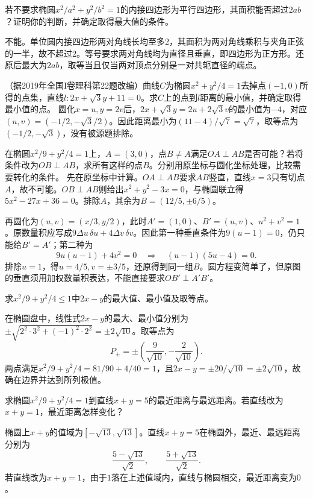 若不要求椭圆\(x^2/a^2+y^2/b^2=1\)的内接四边形为平行四边形，其面积能否超过\(2ab\)？证明你的判断，并确定取得最大值的条件。
\par
\solutionanswer
不能。单位圆内接四边形两对角线长均至多\(2\)，其面积为两对角线乘积与夹角正弦的一半，故不超过\(2\)。等号要求两对角线均为直径且垂直，即四边形为正方形。还原后最大为\(2ab\)，取等当且仅当两对顶点分别是一对共轭直径的端点。


（据2019年全国I卷理科第22题改编）曲线\(C\)为椭圆\(x^2+y^2/4=1\)去掉点\((-1,0)\)所得的点集，直线\(l:2x+\sqrt3y+11=0\)。求\(C\)上的点到\(l\)距离的最小值，并确定取得最小值的点。
\solutionanswer
圆化\(x=u,y=2v\)后，\(2x+\sqrt3y=2u+2\sqrt3v\)的最小值为\(-4\)，对应\((u,v)=(-1/2,-\sqrt3/2)\)。因此距离最小为\((11-4)/\sqrt7=\sqrt7\)，取等点为\((-1/2,-\sqrt3)\)，没有被源题排除。


在椭圆\(x^2/9+y^2/4=1\)上，\(A=(3,0)\)，点\(B\ne A\)满足\(OA\perp AB\)是否可能？若将条件改为\(OB\perp AB\)，求所有这样的点\(B\)。分别用原坐标与圆化坐标处理，比较需要转化的条件。
\solutionanswer
先在原坐标中计算。\(OA\perp AB\)要求\(AB\)竖直，直线\(x=3\)只有切点\(A\)，故不可能。\(OB\perp AB\)则给出\(x^2+y^2-3x=0\)，与椭圆联立得\(5x^2-27x+36=0\)。排除\(A\)，其余为\(B=(12/5,\pm6/5)\)。

再圆化为\((u,v)=(x/3,y/2)\)，此时\(A'=(1,0)\)、\(B'=(u,v)\)、\(u^2+v^2=1\)。原数量积应写成\(9\Delta u\,\delta u+4\Delta v\,\delta v\)。因此第一种垂直条件为\(9(u-1)=0\)，仍只能给\(B'=A'\)；第二种为
\[
 9u(u-1)+4v^2=0
 \quad\Longrightarrow\quad (u-1)(5u-4)=0.
\]
排除\(u=1\)，得\(u=4/5,v=\pm3/5\)，还原得到同一组\(B\)。圆方程变简单了，但原图的垂直须用加权数量积表达，不能直接要求\(OB'\perp A'B'\)。


求\(x^2/9+y^2/4\le1\)中\(2x-y\)的最大值、最小值及取等点。
\par
\solutionanswer
在椭圆盘中，线性式\(2x-y\)的最大、最小值分别为\(\pm\sqrt{2^2\cdot3^2+(-1)^2\cdot2^2}=\pm2\sqrt{10}\)。取等点为
\[
P_{\pm}=\pm\left(\frac{9}{\sqrt{10}},-\frac{2}{\sqrt{10}}\right).
\]
两点满足\(x^2/9+y^2/4=81/90+4/40=1\)，且\(2x-y=\pm20/\sqrt{10}=\pm2\sqrt{10}\)，故确在边界并达到所列极值。


求椭圆\(x^2/9+y^2/4=1\)到直线\(x+y=5\)的最近距离与最远距离。若直线改为\(x+y=1\)，最近距离怎样变化？
\par
\solutionanswer
椭圆上\(x+y\)的值域为\([-\sqrt{13},\sqrt{13}]\)。直线\(x+y=5\)在椭圆外，最近、最远距离分别为
\[
\frac{5-\sqrt{13}}{\sqrt2},\qquad \frac{5+\sqrt{13}}{\sqrt2}.
\]
若直线改为\(x+y=1\)，由于\(1\)落在上述值域内，直线与椭圆相交，最近距离变为\(0\)。


